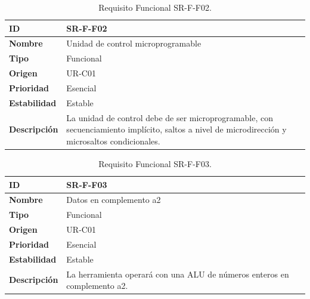 \begin{center}
\begin{table}[htbp]
\centering
\begin{tabular}{@{}p{2.5cm} p{9cm}@{}} 
\toprule
\textbf{ID} 				& SR-F-F02 \\
\midrule
\textbf{Nombre} 			& Unidad de control microprogramable \\
\midrule
\textbf{Tipo} 			& Funcional \\
\midrule
\textbf{Origen} 			& UR-C01 \\
\midrule
\textbf{Prioridad}		& Esencial \\
\midrule
\textbf{Estabilidad} 		& Estable \\
\midrule
\textbf{Descripción} 	& La unidad de control debe de ser microprogramable, con secuenciamiento implícito, saltos a nivel de microdirección y microsaltos condicionales. \\
\bottomrule
\end{tabular}
\caption{Requisito Funcional SR-F-F02.}
\label{tab:srff02}
\end{table}
\end{center}

\begin{center}
\begin{table}[htbp]
\centering
\begin{tabular}{@{}p{2.5cm} p{9cm}@{}} 
\toprule
\textbf{ID} 				& SR-F-F03 \\
\midrule
\textbf{Nombre} 			& Datos en complemento a2 \\
\midrule
\textbf{Tipo} 			& Funcional \\
\midrule
\textbf{Origen} 			& UR-C01 \\
\midrule
\textbf{Prioridad}		& Esencial \\
\midrule
\textbf{Estabilidad} 		& Estable \\
\midrule
\textbf{Descripción} 	& La herramienta operará con una ALU de números enteros en complemento a2. \\
\bottomrule
\end{tabular}
\caption{Requisito Funcional SR-F-F03.}
\label{tab:srff03}
\end{table}
\end{center}


